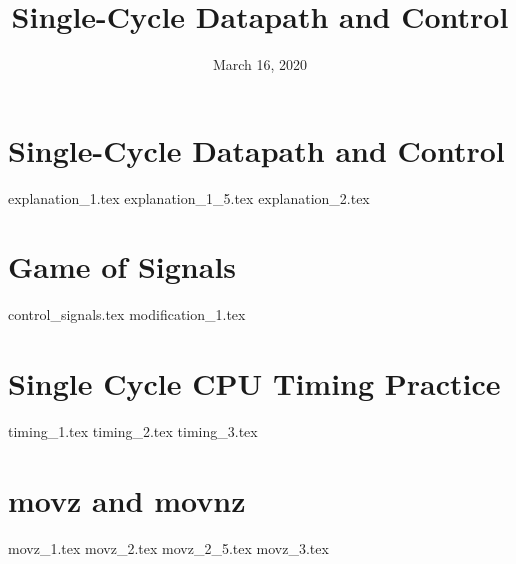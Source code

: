 \documentclass[11pt]{exam}
\title{Single-Cycle Datapath and Control}
\date{March 16, 2020}
\begin{document}
\maketitle

\section{Single-Cycle Datapath and Control}
\begin{questions}
{explanation_1.tex}
{explanation_1_5.tex}
{explanation_2.tex}
\end{questions}
\newpage

\section{Game of Signals}
\begin{questions}
{control_signals.tex}
{modification_1.tex}
\end{questions}
\newpage

\section{Single Cycle CPU Timing Practice}
\begin{questions}
{timing_1.tex}
{timing_2.tex}
{timing_3.tex}
\end{questions}
\newpage

\section{movz and movnz}
\begin{questions}
{movz_1.tex}
{movz_2.tex}
{movz_2_5.tex}
{movz_3.tex}
\end{questions}
\newpage
\end{document}
